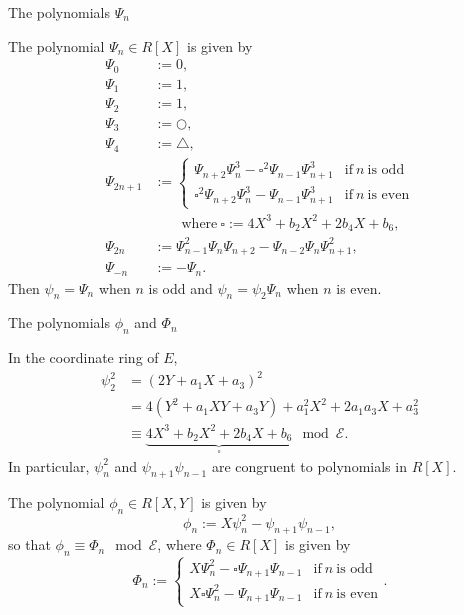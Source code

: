 \documentclass[10pt]{beamer}
\begin{document}
\begin{frame}[t]{The polynomials $ \Psi_n $}

The polynomial $ \Psi_n \in R[X] $ is given by
\begin{align*}
\Psi_0 & := 0, \\
\Psi_1 & := 1, \\
\Psi_2 & := 1, \\
\Psi_3 & := \bigcirc, \\
\Psi_4 & := \triangle, \\
\Psi_{2n + 1} & := \begin{cases} \Psi_{n + 2}\Psi_n^3 - \square^2\Psi_{n - 1}\Psi_{n + 1}^3 & \text{if} \ n \ \text{is odd} \\ \square^2\Psi_{n + 2}\Psi_n^3 - \Psi_{n - 1}\Psi_{n + 1}^3 & \text{if} \ n \ \text{is even} \end{cases} \\
& \qquad \text{where} \ \square := 4X^3 + b_2X^2 + 2b_4X + b_6, \\
\Psi_{2n} & := \Psi_{n - 1}^2\Psi_n\Psi_{n + 2} - \Psi_{n - 2}\Psi_n\Psi_{n + 1}^2, \\
\Psi_{-n} & := -\Psi_n.
\end{align*}
Then $ \psi_n = \Psi_n $ when $ n $ is odd and $ \psi_n = \psi_2\Psi_n $ when $ n $ is even.

\end{frame}

\begin{frame}[t]{The polynomials $ \phi_n $ and $ \Phi_n $}

In the coordinate ring of $ E $,
\begin{align*}
\psi_2^2
& = (2Y + a_1X + a_3)^2 \\
& = 4(Y^2 + a_1XY + a_3Y) + a_1^2X^2 + 2a_1a_3X + a_3^2 \\
& \equiv \underbrace{4X^3 + b_2X^2 + 2b_4X + b_6}_\square \mod \mathcal{E}.
\end{align*}
In particular, $ \psi_n^2 $ and $ \psi_{n + 1}\psi_{n - 1} $ are congruent to polynomials in $ R[X] $.

\pause

\vspace{0.5cm} The polynomial $ \phi_n \in R[X, Y] $ is given by
$$ \phi_n := X\psi_n^2 - \psi_{n + 1}\psi_{n - 1}, $$
so that $ \phi_n \equiv \Phi_n \mod \mathcal{E} $, where $ \Phi_n \in R[X] $ is given by
$$ \Phi_n := \begin{cases} X\Psi_n^2 - \square\Psi_{n + 1}\Psi_{n - 1} & \text{if} \ n \ \text{is odd} \\ X\square\Psi_n^2 - \Psi_{n + 1}\Psi_{n - 1} & \text{if} \ n \ \text{is even} \end{cases}. $$

\end{frame}
\end{document}
